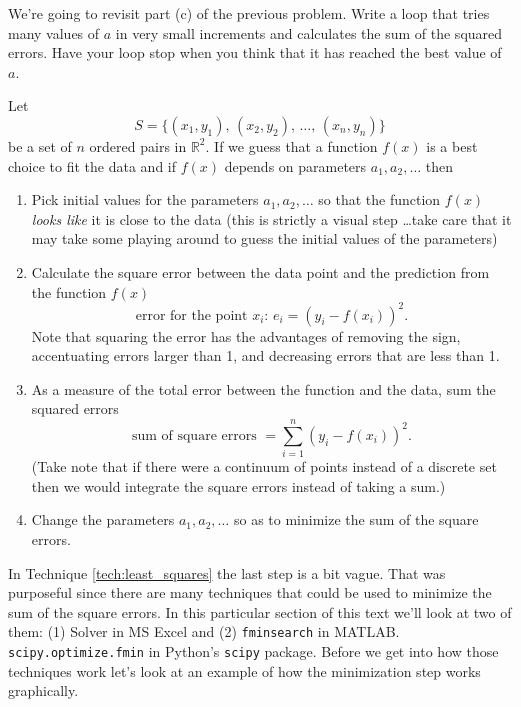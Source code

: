 \begin{problem}
    We're going to revisit part (c) of the previous problem.  Write a loop that tries many
    values of $a$ in very small increments and calculates the sum of the squared errors.
    Have your loop stop when you think that it has reached the best value of $a$.
\end{problem}


\begin{technique}\label{tech:least_squares}
    Let 
    \[ S = \{ (x_1, y_1), \, (x_2, y_2), \, \ldots, \, (x_n, y_n) \} \] 
    be a set of $n$
    ordered pairs in $\mathbb{R}^2$.  If we guess that a function $f(x)$ is a best choice
    to fit the data and if $f(x)$ depends on parameters $a_1, a_2, \ldots$ then 
    \begin{enumerate}
        \item Pick initial values for the parameters $a_1, a_2, \ldots$ so that the
            function $f(x)$ {\it looks like} it is close to the data (this is strictly a
            visual step \ldots take care that it may take some playing around to guess the
            initial values of the parameters)
        \item Calculate the square error between the data point and the prediction from the
            function $f(x)$
            \[ \text{error for the point $x_i$: } e_i = \left( y_i - f(x_i) \right)^2. \]
            Note that squaring the error has the advantages of removing the sign,
            accentuating errors larger than 1, and decreasing errors that are less than 1.
        \item As a measure of the total error between the function and the data, sum the
            squared errors 
            \[ \text{sum of square errors } = \sum_{i=1}^n \left( y_i - f(x_i) \right)^2.
            \]
            (Take note that if there were a continuum of points instead of a discrete set
            then we would integrate the square errors instead of taking a sum.)
        \item Change the parameters $a_1, a_2, \ldots$ so as to minimize the sum of the
            square errors.
    \end{enumerate}
\end{technique}

In Technique \ref{tech:least_squares} the last step is a bit vague.  That was purposeful
since there are many techniques that could be used to minimize the sum of the square
errors.  In this particular section of this text we'll look at two of them: (1) Solver in
MS Excel and (2) 
\ifnum{} \texttt{fminsearch} in MATLAB.
\else
\texttt{scipy.optimize.fmin} in Python's \texttt{scipy} package.
\fi
Before we get into how those techniques
work let's look at an example of how the minimization step works graphically.


